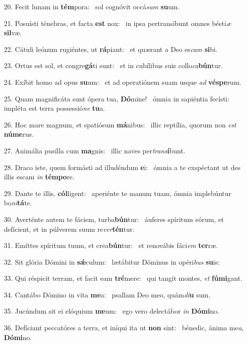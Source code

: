 20. Fecit lunam in \textbf{tém}pora: \ast\  sol cognóvit occá\textit{sum} \textbf{su}um.\

21. Posuísti ténebras, et facta \textbf{est} nox: \ast\  in ipsa pertransíbunt omnes bésti\textit{æ} \textbf{sil}væ.\

22. Cátuli leónum rugiéntes, ut \textbf{rá}piant: \ast\  et quærant a Deo es\textit{cam} \textbf{si}bi.\

23. Ortus est sol, et congre\textbf{gá}ti sunt: \ast\  et in cubílibus suis collo\textit{ca}\textbf{bún}tur.\

24. Exíbit homo ad opus \textbf{su}um: \ast\  et ad operatiónem suam usque \textit{ad} \textbf{vés}\textbf{pe}rum.\

25. Quam magnificáta sunt ópera tua, \textbf{Dó}mine! \ast\  ómnia in sapiéntia fecísti: impléta est terra possessió\textit{ne} \textbf{tu}a.\

26. Hoc mare magnum, et spatiósum \textbf{má}nibus: \ast\  illic reptília, quorum non \textit{est} \textbf{nú}\textbf{me}rus.\

27. Animália pusílla cum \textbf{ma}gnis: \ast\  illic naves per\textit{trans}\textbf{í}bunt.\

28. Draco iste, quem formásti ad illudéndum \textbf{e}i: \ast\  ómnia a te exspéctant ut des illis escam \textit{in} \textbf{tém}\textbf{po}re.\

29. Dante te illis, \textbf{cól}ligent: \ast\  aperiénte te manum tuam, ómnia implebúntur bo\textit{ni}\textbf{tá}te.\

30. Averténte autem te fáciem, turba\textbf{bún}tur: \ast\  áuferes spíritum eórum, et defícient, et in púlverem suum re\textit{ver}\textbf{tén}tur.\

31. Emíttes spíritum tuum, et crea\textbf{bún}tur: \ast\  et renovábis fáci\textit{em} \textbf{ter}ræ.\

32. Sit glória Dómini in \textbf{sǽ}culum: \ast\  lætábitur Dóminus in opéri\textit{bus} \textbf{su}is:\

33. Qui réspicit terram, et facit eam \textbf{tré}mere: \ast\  qui tangit montes, \textit{et} \textbf{fú}\textbf{mi}gant.\

34. Cantábo Dómino in vita \textbf{me}a: \ast\  psallam Deo meo, quám\textit{di}\textbf{u} sum.\

35. Jucúndum sit ei elóquium \textbf{me}um: \ast\  ego vero delectábor \textit{in} \textbf{Dó}\textbf{mi}no.\

36. Defíciant peccatóres a terra, et iníqui ita ut \textbf{non} sint: \ast\  bénedic, ánima me\textit{a}, \textbf{Dó}\textbf{mi}no.\

